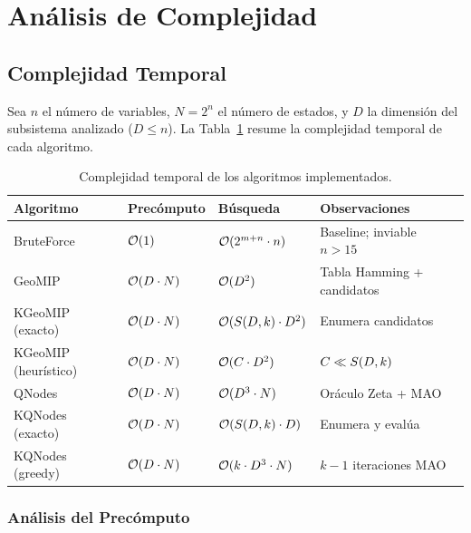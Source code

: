 \section{Análisis de Complejidad}
\label{sec:complejidad}

\subsection{Complejidad Temporal}

Sea $n$ el número de variables, $N = 2^n$ el número de estados, y $D$ la dimensión del subsistema analizado ($D \leq n$). La Tabla~\ref{tab:complejidad} resume la complejidad temporal de cada algoritmo.

\begin{table}[H]
    \centering
    \caption{Complejidad temporal de los algoritmos implementados.}
    \label{tab:complejidad}
    \begin{tabular}{lllp{4.2cm}}
        \toprule
        \textbf{Algoritmo} & \textbf{Precómputo} & \textbf{Búsqueda} & \textbf{Observaciones} \\
        \midrule
        BruteForce           & $\mathcal{O}(1)$          & $\mathcal{O}(2^{m+n}\cdot n)$         & Baseline; inviable $n>15$ \\
        GeoMIP               & $\mathcal{O}(D \cdot N)$  & $\mathcal{O}(D^2)$                    & Tabla Hamming + candidatos \\
        KGeoMIP (exacto)     & $\mathcal{O}(D \cdot N)$  & $\mathcal{O}(S(D,k)\cdot D^2)$ & Enumera candidatos \\
        KGeoMIP (heurístico) & $\mathcal{O}(D \cdot N)$  & $\mathcal{O}(C \cdot D^2)$            & $C \ll S(D,k)$ \\
        QNodes               & $\mathcal{O}(D \cdot N)$  & $\mathcal{O}(D^3 \cdot N)$            & Oráculo Zeta + MAO \\
        KQNodes (exacto)     & $\mathcal{O}(D \cdot N)$  & $\mathcal{O}(S(D,k)\cdot D)$ & Enumera y evalúa \\
        KQNodes (greedy)     & $\mathcal{O}(D \cdot N)$  & $\mathcal{O}(k \cdot D^3 \cdot N)$   & $k-1$ iteraciones MAO \\
        \bottomrule
    \end{tabular}
\end{table}

\subsubsection{Análisis del Precómputo}

